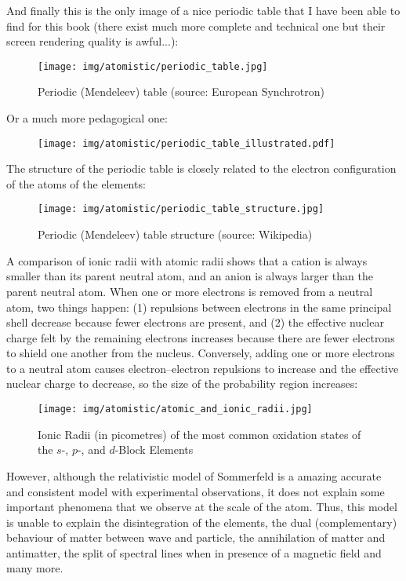 	And finally this is the only image of a nice periodic table that I have been able to find for this book (there exist much more complete and technical one but their screen rendering quality is awful...):
	\begin{figure}[H]
		\centering
		\texttt{[image: img/atomistic/periodic\_table.jpg]}
		\caption[Periodic (Mendeleev) table]{Periodic (Mendeleev) table (source: European Synchrotron)}
	\end{figure}
	Or a much more pedagogical one:
	\begin{figure}[H]
		\centering
		\texttt{[image: img/atomistic/periodic\_table\_illustrated.pdf]}
	\end{figure}
	\pagebreak
	The structure of the periodic table is closely related to the electron configuration of the atoms of the elements:
	\begin{figure}[H]
		\centering
		\texttt{[image: img/atomistic/periodic\_table\_structure.jpg]}
		\caption[Periodic (Mendeleev) table structure]{Periodic (Mendeleev) table structure (source: Wikipedia)}
	\end{figure}
	A comparison of ionic radii with atomic radii shows that a cation is always smaller than its parent neutral atom, and an anion is always larger than the parent neutral atom. When one or more electrons is removed from a neutral atom, two things happen: (1) repulsions between electrons in the same principal shell decrease because fewer electrons are present, and (2) the effective nuclear charge felt by the remaining electrons increases because there are fewer electrons to shield one another from the nucleus. Conversely, adding one or more electrons to a neutral atom causes electron–electron repulsions to increase and the effective nuclear charge to decrease, so the size of the probability region increases:
	\begin{figure}[H]
		\centering
		\texttt{[image: img/atomistic/atomic\_and\_ionic\_radii.jpg]}
		\caption[Atomic and ionic radii]{Ionic Radii (in picometres) of the most common oxidation states of the $s$-, $p$-, and $d$-Block Elements}
	\end{figure}
	However, although the relativistic model of Sommerfeld is a amazing accurate and consistent model with experimental observations, it does not explain some important phenomena that we observe at the scale of the atom. Thus, this model is unable to explain the disintegration of the elements, the dual (complementary) behaviour of matter between wave and particle, the annihilation of matter and antimatter, the split of spectral lines when in presence of a magnetic field and many more.
